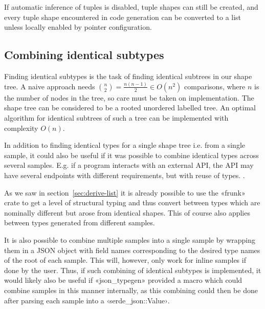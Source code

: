 If automatic inference of tuples is disabled, tuple shapes can still be created, and every tuple shape encountered in code generation can be converted to a list unless locally enabled by pointer configuration.

\subsection{Combining identical subtypes}


Finding identical subtypes is the task of finding identical subtrees in our shape tree. A naive approach needs $\binom{n}{2} = \frac{n(n-1)}{2} \in O(n^2)$ comparisons, where $n$ is the number of nodes in the tree, so care must be taken on implementation. The shape tree can be considered to be a rooted unordered labelled tree. An optimal algorithm for identical subtrees of such a tree can be implemented with complexity $O(n)$.

In addition to finding identical types for a single shape tree i.e. from a single sample, it could also be useful if it was possible to combine identical types across several samples. E.g. if a program interacts with an external API, the API may have several endpoints with different requirements, but with reuse of types. .

As we saw in section~\ref{sec:derive-list} it is already possible to use the «frunk» crate to get a level of structural typing and thus convert between types which are nominally different but arose from identical shapes. This of course also applies between types generated from different samples.

It is also possible to combine multiple samples into a single sample by wrapping them in a JSON object with field names corresponding to the desired type names of the root of each sample. This will, however, only work for inline samples if done by the user. Thus, if such combining of identical subtypes is implemented, it would likely also be useful if «json_typegen» provided a macro which could combine samples in this manner internally, as this combining could then be done after parsing each sample into a ‹serde_json::Value›.
